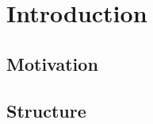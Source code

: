 \chapter{Introduction}
\thispagestyle{chapterBeginStyle}


\section{Motivation}

\section{Structure}
